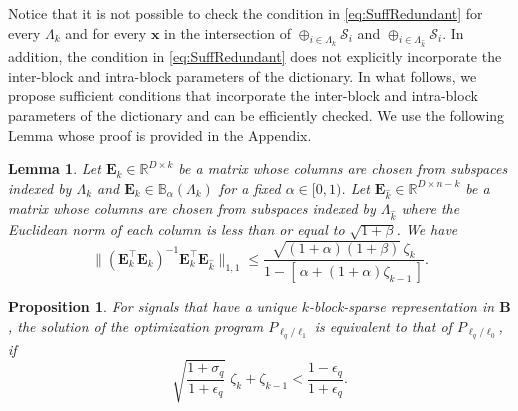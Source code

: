 \documentclass[10pt,twocolumn,twoside] {IEEEtran}
\newtheorem{lemma}{Lemma}
\newtheorem{proposition}{Proposition}
\begin{document}
{Notice that it is not possible to check the condition in \eqref{eq:SuffRedundant} for every $\Lambda_k$ and for every ${{\mathbf x}}$ in the intersection of $\oplus_{i \in \Lambda_k}{\mathcal{S}_i}$ and $\oplus_{i \in \Lambda_{\widehat{k}}}{\mathcal{S}_i}$. In addition, the condition in \eqref{eq:SuffRedundant} does not explicitly incorporate the inter-block and intra-block parameters of the dictionary. In what follows, we propose sufficient conditions that incorporate the inter-block and intra-block parameters of the dictionary and can be efficiently checked. We use the following Lemma whose proof is provided in the Appendix. 
\vspace{1mm}
\begin{lemma}
\label{lem:matrix}
Let ${\boldsymbol{E}}_k \in {\mathbb{R}}^{D \times k}$ be a matrix whose columns are chosen from subspaces indexed by $\Lambda_k$ and ${\boldsymbol{E}}_k \in \mathbb{B}_{\alpha}(\Lambda_k)$ for a fixed $\alpha \in [0,1)$. Let ${\boldsymbol{E}}_{\widehat{k}} \in {\mathbb{R}}^{D \times n-k}$ be a matrix whose columns are chosen from subspaces indexed by $\Lambda_{\widehat{k}}$ where the Euclidean norm of each column is less than or equal to $\sqrt{1+\beta}$. We have
\begin{equation}
\| ({\boldsymbol{E}}_k^{\top} {\boldsymbol{E}}_k )^{-1} {\boldsymbol{E}}_k^{\top} {\boldsymbol{E}}_{\widehat{k}} \|_{1,1} \leq \frac{ \sqrt{(1+\alpha) (1+\beta)} \, \zeta_k }{ 1 - [\, \alpha + (1+\alpha) \zeta_{k-1} \,] }.
\end{equation}
\end{lemma}
\vspace{1mm}
\begin{proposition}
\label{prop:suff1}
For signals that have a unique $k$-block-sparse representation in ${\boldsymbol{B}}$, the solution of the optimization program $P_{\ell_q/\ell_1}$ is equivalent to that of $P_{\ell_q/\ell_0}$, if
\begin{equation}
\label{eq:cumsubLqL1suff}
\sqrt{\frac{1+\sigma_q}{1+\epsilon_q}} \; \zeta_k + \zeta_{k-1} < \frac{1-\epsilon_q}{1+\epsilon_q}.
\end{equation}
\end{proposition}
\vspace{1mm}

}
\end{document}
